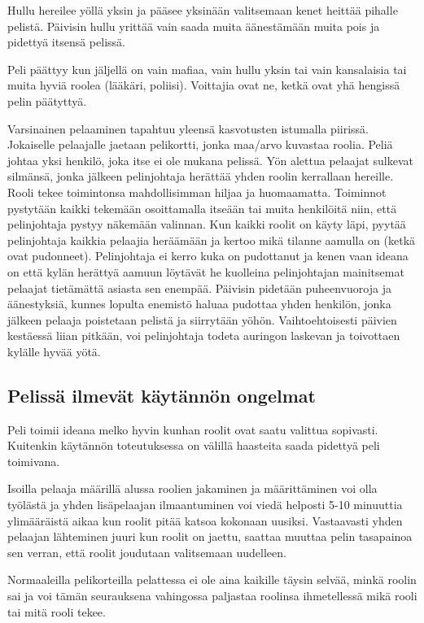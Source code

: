Hullu hereilee yöllä yksin ja pääsee yksinään valitsemaan kenet heittää pihalle
pelistä. Päivisin hullu yrittää vain saada muita äänestämään muita pois ja
pidettyä itsensä pelissä.

Peli päättyy kun jäljellä on vain mafiaa, vain hullu yksin tai vain kansalaisia
tai muita hyviä roolea (lääkäri, poliisi). Voittajia ovat ne, ketkä ovat yhä
hengissä pelin päätyttyä.

Varsinainen pelaaminen tapahtuu yleensä kasvotusten istumalla piirissä.
Jokaiselle pelaajalle jaetaan pelikortti, jonka maa/arvo kuvastaa roolia.
Peliä johtaa yksi henkilö, joka itse ei ole mukana pelissä. Yön alettua
pelaajat sulkevat silmänsä, jonka jälkeen pelinjohtaja herättää yhden roolin
kerrallaan hereille. Rooli tekee toimintonsa mahdollisimman hiljaa ja
huomaamatta. Toiminnot pystytään kaikki tekemään osoittamalla itseään tai
muita henkilöitä niin, että pelinjohtaja pystyy näkemään valinnan. Kun kaikki
roolit on käyty läpi, pyytää pelinjohtaja kaikkia pelaajia heräämään ja kertoo
mikä tilanne aamulla on (ketkä ovat pudonneet). Pelinjohtaja ei kerro kuka on
pudottanut ja kenen vaan ideana on että kylän herättyä aamuun löytävät he
kuolleina pelinjohtajan mainitsemat pelaajat tietämättä asiasta sen enempää.
Päivisin pidetään puheenvuoroja ja äänestyksiä, kunnes lopulta enemistö haluaa
pudottaa yhden henkilön, jonka jälkeen pelaaja poistetaan pelistä ja siirrytään
yöhön. Vaihtoehtoisesti päivien kestäessä liian pitkään, voi pelinjohtaja
todeta auringon laskevan ja toivottaen kylälle hyvää yötä.

\subsection{Pelissä ilmevät käytännön ongelmat}

Peli toimii ideana melko hyvin kunhan roolit ovat saatu valittua sopivasti.
Kuitenkin käytännön toteutuksessa on välillä haasteita saada pidettyä peli
toimivana.

Isoilla pelaaja määrillä alussa roolien jakaminen ja määrittäminen
voi olla työlästä ja yhden lisäpelaajan ilmaantuminen voi viedä helposti 5-10
minuuttia ylimääräistä aikaa kun roolit pitää katsoa kokonaan uusiksi.
Vastaavasti yhden pelaajan lähteminen juuri kun roolit on jaettu, saattaa
muuttaa pelin tasapainoa sen verran, että roolit joudutaan valitsemaan
uudelleen.

Normaaleilla pelikorteilla pelattessa ei ole aina kaikille täysin selvää, minkä
roolin sai ja voi tämän seurauksena vahingossa paljastaa roolinsa ihmetellessä
mikä rooli tai mitä rooli tekee.

